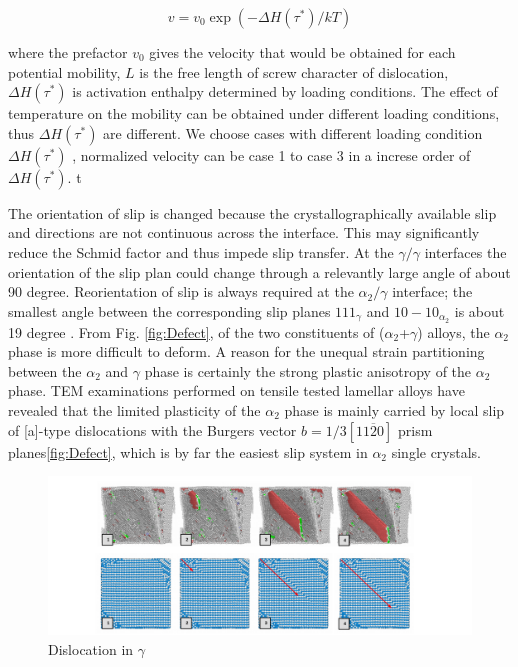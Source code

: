 \documentclass[metals,article,submit,moreauthors,pdftex,10pt,a4paper]{Definitions/mdpi}
\begin{document}
\begin{equation}\label{eq:temp-dis}
v = v_0 \exp(-\Delta H(\tau^*)/kT)
\end{equation}

where the prefactor $v_0$ gives the velocity that would be obtained for each potential mobility, $L$ is the free length of screw character of dislocation, $\Delta H(\tau^*)$ is activation enthalpy determined by loading conditions. The effect of temperature on the mobility can be obtained under different loading conditions, thus  $\Delta H(\tau^*)$ are different. We choose cases with different loading condition$\Delta H(\tau^*)$  , normalized velocity can be  case 1 to case 3  in a increse order of $\Delta H(\tau^*)$. t


The orientation of slip is changed because the crystallographically available slip and directions are not continuous across the interface. This may significantly reduce the Schmid factor and thus impede slip transfer. At the $\gamma/\gamma$ interfaces the orientation of the slip plan could change through a relevantly large angle of about 90 degree. Reorientation of slip is always required at the $\alpha_{2}/\gamma$ interface; the smallest angle between the corresponding slip planes ${1 1 1}_{\gamma}$ and ${ 1 0 -1 0}_{\alpha_2}$ is about 19 degree \cite{}. From Fig. \ref{fig:Defect}, of the two constituents of ($\alpha_2$+$\gamma$) alloys, the $\alpha_2$ phase is more difficult to deform. A reason for the unequal strain partitioning between the $\alpha_2$ and $\gamma$ phase is certainly the strong plastic anisotropy of the $\alpha_2$ phase. TEM examinations performed on tensile tested lamellar alloys have revealed that the limited plasticity of the $\alpha_2$ phase is mainly carried by local slip of [a]-type dislocations with the Burgers vector $b=1/3[11\overline{2}0]$ prism planes\ref{fig:Defect}, which is by far the easiest slip system in $\alpha_2$ single crystals. 




	\begin{figure}[ht]
		\centering
		\includegraphics[width=1\linewidth]{"img/disl-gamma"}
		\caption{Dislocation in $\gamma$}
		\label{fig:dis-alpha_2}
	\end{figure}
\end{document}
